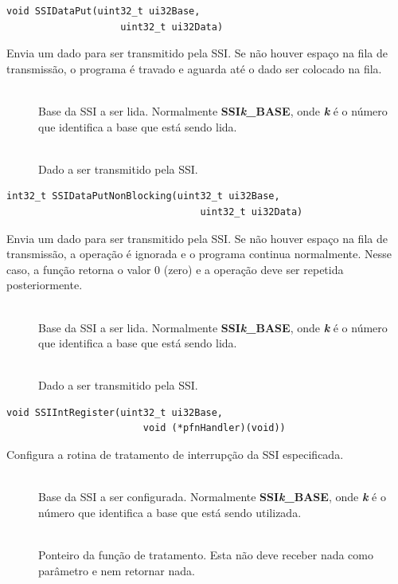 \begin{lstlisting}[style=funcao]
	void SSIDataPut(uint32_t ui32Base,
					uint32_t ui32Data)
\end{lstlisting}

Envia um dado para ser transmitido pela SSI. Se não houver espaço na fila de transmissão, o programa é travado e aguarda até o dado ser colocado na fila.

\begin{description}
	\item []\hfill \\
	Base da SSI a ser lida. Normalmente \textbf{SSI\emph{k}\_BASE}, onde \textbf{\emph{k}} é o número que identifica a base que está sendo lida.
	
	\item []\hfill \\
	Dado a ser transmitido pela SSI.
\end{description}

\begin{lstlisting}[style=funcao]
	int32_t SSIDataPutNonBlocking(uint32_t ui32Base,
								  uint32_t ui32Data)
\end{lstlisting}

Envia um dado para ser transmitido pela SSI. Se não houver espaço na fila de transmissão, a operação é ignorada e o programa continua normalmente. Nesse caso, a função retorna o valor 0 (zero) e a operação deve ser repetida posteriormente.

\begin{description}
	\item []\hfill \\
	Base da SSI a ser lida. Normalmente \textbf{SSI\emph{k}\_BASE}, onde \textbf{\emph{k}} é o número que identifica a base que está sendo lida.
	
	\item []\hfill \\
	Dado a ser transmitido pela SSI.
\end{description}

\begin{lstlisting}[style=funcao]
	void SSIIntRegister(uint32_t ui32Base,
						void (*pfnHandler)(void))
\end{lstlisting}

Configura a rotina de tratamento de interrupção da SSI especificada.

\begin{description}
	\item []\hfill \\
	Base da SSI a ser configurada. Normalmente \textbf{SSI\emph{k}\_BASE}, onde \textbf{\emph{k}} é o número que identifica a base que está sendo utilizada.
	
	\item []\hfill \\
	Ponteiro da função de tratamento. Esta não deve receber nada como parâmetro e nem retornar nada.
\end{description}


